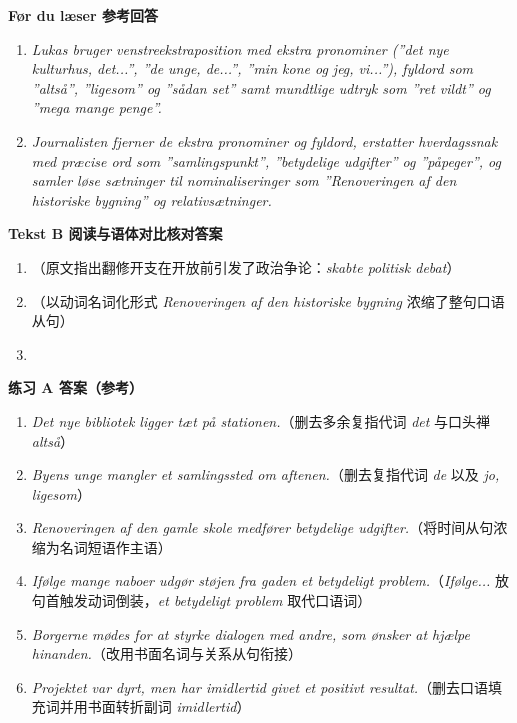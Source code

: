 \begin{answerbox}
\textbf{Før du læser 参考回答}
\begin{enumerate}
  \item \textit{Lukas bruger venstreekstraposition med ekstra pronominer (”det nye kulturhus, det...”, ”de unge, de...”, ”min kone og jeg, vi...”), fyldord som ”altså”, ”ligesom” og ”sådan set” samt mundtlige udtryk som ”ret vildt” og ”mega mange penge”.}
  \item \textit{Journalisten fjerner de ekstra pronominer og fyldord, erstatter hverdagssnak med præcise ord som ”samlingspunkt”, ”betydelige udgifter” og ”påpeger”, og samler løse sætninger til nominaliseringer som ”Renoveringen af den historiske bygning” og relativsætninger.}
\end{enumerate}

\textbf{Tekst B 阅读与语体对比核对答案}
\begin{enumerate}
  \item {}（原文指出翻修开支在开放前引发了政治争论：\textit{skabte politisk debat}）
  \item {}（以动词名词化形式 \textit{Renoveringen af den historiske bygning} 浓缩了整句口语从句）
  \item {}
\end{enumerate}

\textbf{练习 A 答案（参考）}
\begin{enumerate}
  \item \textit{Det nye bibliotek ligger tæt på stationen.}（删去多余复指代词 \textit{det} 与口头禅 \textit{altså}）
  \item \textit{Byens unge mangler et samlingssted om aftenen.}（删去复指代词 \textit{de} 以及 \textit{jo, ligesom}）
  \item \textit{Renoveringen af den gamle skole medfører betydelige udgifter.}（将时间从句浓缩为名词短语作主语）
  \item \textit{Ifølge mange naboer udgør støjen fra gaden et betydeligt problem.}（\textit{Ifølge...} 放句首触发动词倒装，\textit{et betydeligt problem} 取代口语词）
  \item \textit{Borgerne mødes for at styrke dialogen med andre, som ønsker at hjælpe hinanden.}（改用书面名词与关系从句衔接）
  \item \textit{Projektet var dyrt, men har imidlertid givet et positivt resultat.}（删去口语填充词并用书面转折副词 \textit{imidlertid}）
\end{enumerate}


\end{answerbox}
